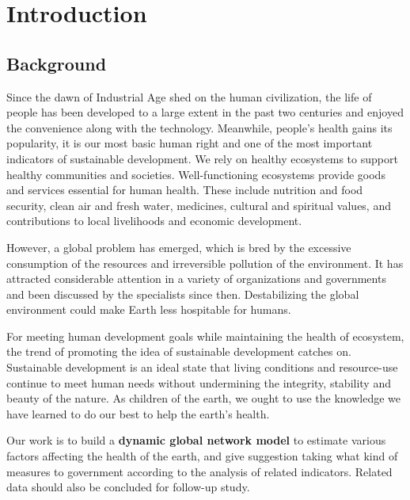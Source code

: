 \documentclass[a4paper,11pt]{article}
\begin{document}
\maketitle%
\thispagestyle{empty}%

\newpage%
\thispagestyle{empty}%
\tableofcontents%
\thispagestyle{empty}
\newpage%

\section{Introduction}

\subsection{Background}
\par Since the dawn of Industrial Age shed on the human civilization, the life of people has been developed to a large extent in the past two centuries and enjoyed the convenience along with the technology. Meanwhile, people's health gains its popularity, it is our most basic human right and one of the most important indicators of sustainable development. We rely on healthy ecosystems to support healthy communities and societies. Well-functioning ecosystems provide goods and services essential for human health.  These include nutrition and food security, clean air and fresh water, medicines, cultural and spiritual values, and contributions to local livelihoods and economic development.
\par However, a global problem has emerged, which is bred by the excessive consumption of the resources and irreversible pollution of the environment. It has attracted considerable attention in a variety of organizations and governments and been discussed by the specialists since then. Destabilizing the global environment could make Earth less hospitable for humans. 
\par For meeting human development goals while maintaining the health of ecosystem, the trend of promoting the idea of sustainable development catches on. Sustainable development is an ideal state that living conditions and resource-use continue to meet human needs without undermining the integrity, stability and beauty of the nature. As children of the earth, we ought to use the knowledge we have learned to do our best to help the earth's health.
\par Our work is to build a \textbf{dynamic global network model} to estimate various factors affecting the health of the earth, and give suggestion taking what kind of measures to government according to the analysis of related indicators. Related data should also be concluded for follow-up study.
\end{document}
